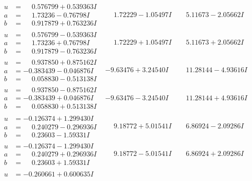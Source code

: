 \documentclass[1p]{elsarticle_modified}
\theoremstyle{definition}
\begin{document}
$$\begin{array}{c|c|c}
 \hline 
\begin{aligned}
u &= \phantom{-}0.576799 + 0.539363 I \\
a &= \phantom{-}1.73236 - 0.76798 I \\
b &= \phantom{-}0.917879 + 0.763236 I\end{aligned}
 & \phantom{-}1.72229 - 1.05497 I & \phantom{-}5.11673 - 2.05662 I \\ \hline\begin{aligned}
u &= \phantom{-}0.576799 - 0.539363 I \\
a &= \phantom{-}1.73236 + 0.76798 I \\
b &= \phantom{-}0.917879 - 0.763236 I\end{aligned}
 & \phantom{-}1.72229 + 1.05497 I & \phantom{-}5.11673 + 2.05662 I \\ \hline\begin{aligned}
u &= \phantom{-}0.937850 + 0.875162 I \\
a &= -0.383439 - 0.046876 I \\
b &= \phantom{-}0.058830 - 0.513138 I\end{aligned}
 & -9.63476 + 3.24540 I & \phantom{-}11.28144 - 4.93616 I \\ \hline\begin{aligned}
u &= \phantom{-}0.937850 - 0.875162 I \\
a &= -0.383439 + 0.046876 I \\
b &= \phantom{-}0.058830 + 0.513138 I\end{aligned}
 & -9.63476 - 3.24540 I & \phantom{-}11.28144 + 4.93616 I \\ \hline\begin{aligned}
u &= -0.126374 + 1.299430 I \\
a &= \phantom{-}0.240279 - 0.296936 I \\
b &= \phantom{-}0.23603 - 1.59331 I\end{aligned}
 & \phantom{-}9.18772 + 5.01541 I & \phantom{-}6.86924 - 2.09286 I \\ \hline\begin{aligned}
u &= -0.126374 - 1.299430 I \\
a &= \phantom{-}0.240279 + 0.296936 I \\
b &= \phantom{-}0.23603 + 1.59331 I\end{aligned}
 & \phantom{-}9.18772 - 5.01541 I & \phantom{-}6.86924 + 2.09286 I \\ \hline\begin{aligned}
u &= -0.260661 + 0.600635 I \\

\end{aligned}
\end{array}$$
\end{document}
